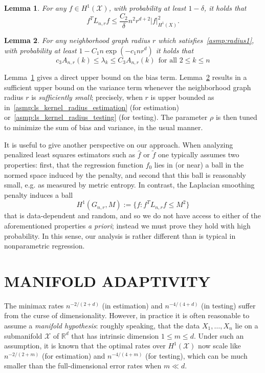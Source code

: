 \documentclass[twoside]{article}
\newcommand{\Reals}{\mathbb{R}}
\newcommand{\1}{\mathbf{1}}
\newcommand{\Rd}{\Reals^d}
\newcommand{\Lap}{L}
\newcommand{\Xset}{\mathcal{X}}
\newcommand{\wt}[1]{\widetilde{#1}}
\newcommand{\wh}[1]{\widehat{#1}}
\newtheorem{lemma}{Lemma}
\theoremstyle{definition}
\theoremstyle{remark}
\begin{document}
\begin{lemma}
	\label{lem:graph_sobolev_seminorm}
	For any $f \in H^1(\Xset)$, with probability at least $1 - \delta$, it holds that
	\begin{equation}
	\label{eqn:graph_sobolev_seminorm}
	f^T \Lap_{n,r} f \leq \frac{C_2}{\delta} n^2 r^{d + 2} |f|_{H^1(X)}^2.
	\end{equation}
\end{lemma}
\begin{lemma}
	\label{lem:neighborhood_eigenvalue}
	For any neighborhood graph radius $r$ which satisfies~\ref{asmp:radius1}, with probability at least $1 - C_1n\exp(-c_1nr^d)$ it holds that
	\begin{equation}
	\label{eqn:neighborhood_eigenvalue}
	c_3A_{n,r}(k) \leq \lambda_k \leq C_3A_{n,r}(k)~~\textrm{for all $2 \leq k \leq n$}
	\end{equation}
\end{lemma}

Lemma~\ref{lem:graph_sobolev_seminorm} gives a direct upper bound on the bias term. Lemma~\ref{lem:neighborhood_eigenvalue} results in a sufficient upper bound on the variance term whenever the neighborhood graph radius $r$ is \textit{sufficiently small}; precisely, when $r$ is upper bounded as in~\ref{asmp:ls_kernel_radius_estimation} (for estimation) or~\ref{asmp:ls_kernel_radius_testing} (for testing). The parameter $\rho$ is then tuned to minimize the sum of bias and variance, in the usual manner.

It is useful to give another perspective on our approach. When analyzing penalized least squares estimators such as $\wh{f}$ or $\wt{f}$ one typically assumes two properties: first, that the regression function $f_0$ lies in (or near) a ball in the normed space induced by the penalty, and second that this ball is reasonably small, e.g. as measured by metric entropy. In contrast, the Laplacian smoothing penalty induces a ball
\begin{equation*}
H^1(G_{n,r},M) := \{f: f^T \Lap_{n,r} f \leq M^2\}
\end{equation*}
that is data-dependent and random, and so we do not have access to either of the aforementioned properties \emph{a priori}; instead we must prove they hold with high probability. In this sense, our analysis is rather different than is typical in nonparametric regression.

\section{MANIFOLD ADAPTIVITY}
\label{sec:manifold_adaptivity}
The minimax rates $n^{-2/(2 + d)}$ (in estimation) and $n^{-4/(4 + d)}$ (in testing) suffer from the curse of dimensionality. However, in practice it is often reasonable to assume a \emph{manifold hypothesis}: roughly speaking, that the data $X_1,\ldots,X_n$ lie on a submanifold $\Xset$ of $\Rd$ that has intrinsic dimension $1 \leq m \leq d$. Under such an assumption, it is known \citep{bickel2007, ariascastro2018} that the optimal rates over $H^1(\Xset)$ now scale like $n^{-2/(2 + m)}$ (for estimation) and $n^{-4/(4 + m)}$ (for testing), which can be much smaller than the full-dimensional error rates when $m \ll d$. 
\end{document}
